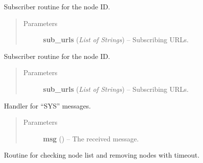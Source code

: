 \documentclass[letterpaper,10pt,english]{sphinxmanual}
\begin{document}
\begin{fulllineitems}
\begin{fulllineitems}
\label{swnp:swnp.SWNP.sub_routine}
Subscriber routine for the node ID.
\begin{quote}\begin{description}
\item[{Parameters}] \leavevmode
\textbf{sub\_urls} (\emph{List of Strings}) -- Subscribing URLs.

\end{description}\end{quote}

\end{fulllineitems}


\begin{fulllineitems}
\label{swnp:swnp.SWNP.sub_routine_sys}
Subscriber routine for the node ID.
\begin{quote}\begin{description}
\item[{Parameters}] \leavevmode
\textbf{sub\_urls} (\emph{List of Strings}) -- Subscribing URLs.

\end{description}\end{quote}

\end{fulllineitems}


\begin{fulllineitems}
\label{swnp:swnp.SWNP.sys_handler}
Handler for ``SYS'' messages.
\begin{quote}\begin{description}
\item[{Parameters}] \leavevmode
\textbf{msg} ({\hyperref[swnp:swnp.Message]{}}) -- The received message.

\end{description}\end{quote}

\end{fulllineitems}


\begin{fulllineitems}
\label{swnp:swnp.SWNP.timeout_routine}
Routine for checking node list and removing nodes with timeout.

\end{fulllineitems}


\end{fulllineitems}
\end{document}
